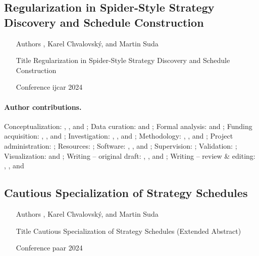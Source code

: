 \documentclass{article}
\begin{document}
\subsection{Regularization in Spider-Style Strategy Discovery and Schedule Construction \cite{DBLP:conf/ijcar/BartekCS24}}

\begin{itemize}
\item[Authors] , Karel Chvalovský, and Martin Suda
\item[Title] Regularization in Spider-Style Strategy Discovery and Schedule Construction
\item[Conference] \Acrfull{ijcar} 2024
\end{itemize}

\paragraph{Author contributions.}
Conceptualization:            \MS{}, \FB{}, and \KC{};
Data curation:                \FB{} and \MS{};
Formal analysis:              \FB{} and \MS{};
Funding acquisition:          \MS{}, \JU{}, and \FB{};
Investigation:                \FB{}, \MS{}, and \KC{};
Methodology:                  \MS{}, \FB{}, and \KC{};
Project administration:       \MS{};
Resources:                    \JU{};
Software:                     \FB{}, \MS{}, and \KC{};
Supervision:                  \MS{};
Validation:                   \FB{};
Visualization:                \FB{} and \MS{};
Writing -- original draft:    \MS{}, \FB{}, and \KC{};
Writing -- review \& editing: \FB{}, \MS{}, and \KC{}

\subsection{Cautious Specialization of Strategy Schedules \cite{DBLP:conf/paar/BartekC024}}

\begin{itemize}
\item[Authors] , Karel Chvalovský, and Martin Suda
\item[Title] Cautious Specialization of Strategy Schedules (Extended Abstract)
\item[Conference] \Acrfull{paar} 2024
\end{itemize}
\end{document}
